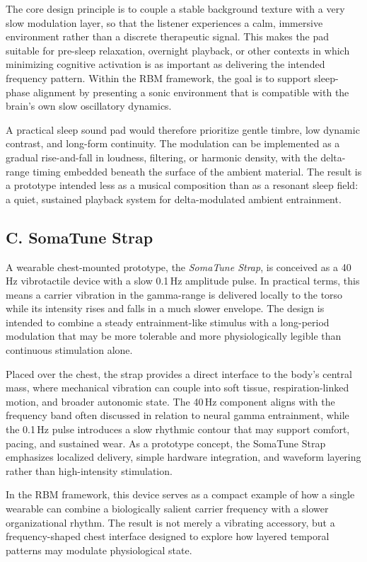 \documentclass[11pt]{article}
\begin{document}
The core design principle is to couple a stable background texture with a very slow modulation layer, so that the listener experiences a calm, immersive environment rather than a discrete therapeutic signal. This makes the pad suitable for pre-sleep relaxation, overnight playback, or other contexts in which minimizing cognitive activation is as important as delivering the intended frequency pattern. Within the RBM framework, the goal is to support sleep-phase alignment by presenting a sonic environment that is compatible with the brain's own slow oscillatory dynamics.

A practical sleep sound pad would therefore prioritize gentle timbre, low dynamic contrast, and long-form continuity. The modulation can be implemented as a gradual rise-and-fall in loudness, filtering, or harmonic density, with the delta-range timing embedded beneath the surface of the ambient material. The result is a prototype intended less as a musical composition than as a resonant sleep field: a quiet, sustained playback system for delta-modulated ambient entrainment.


\subsection{C. SomaTune Strap}

A wearable chest-mounted prototype, the \emph{SomaTune Strap}, is conceived as a 40\,Hz vibrotactile device with a slow 0.1\,Hz amplitude pulse. In practical terms, this means a carrier vibration in the gamma-range is delivered locally to the torso while its intensity rises and falls in a much slower envelope. The design is intended to combine a steady entrainment-like stimulus with a long-period modulation that may be more tolerable and more physiologically legible than continuous stimulation alone.

Placed over the chest, the strap provides a direct interface to the body’s central mass, where mechanical vibration can couple into soft tissue, respiration-linked motion, and broader autonomic state. The 40\,Hz component aligns with the frequency band often discussed in relation to neural gamma entrainment, while the 0.1\,Hz pulse introduces a slow rhythmic contour that may support comfort, pacing, and sustained wear. As a prototype concept, the SomaTune Strap emphasizes localized delivery, simple hardware integration, and waveform layering rather than high-intensity stimulation.

In the RBM framework, this device serves as a compact example of how a single wearable can combine a biologically salient carrier frequency with a slower organizational rhythm. The result is not merely a vibrating accessory, but a frequency-shaped chest interface designed to explore how layered temporal patterns may modulate physiological state.
\end{document}
